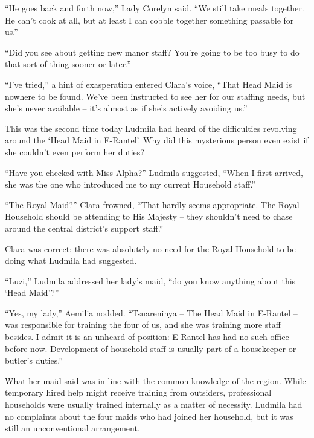  

“He goes back and forth now,” Lady Corelyn said. “We still take meals together. He can’t cook at all, but at least I can cobble together something passable for us.”

 

“Did you see about getting new manor staff? You’re going to be too busy to do that sort of thing sooner or later.”

 

“I’ve tried,” a hint of exasperation entered Clara’s voice, “That Head Maid is nowhere to be found. We’ve been instructed to see her for our staffing needs, but she's never available – it’s almost as if she’s actively avoiding us.”

 

This was the second time today Ludmila had heard of the difficulties revolving around the ‘Head Maid in E-Rantel’. Why did this mysterious person even exist if she couldn’t even perform her duties?

 

“Have you checked with Miss Alpha?” Ludmila suggested, “When I first arrived, she was the one who introduced me to my current Household staff.”

 

“The Royal Maid?” Clara frowned, “That hardly seems appropriate. The Royal Household should be attending to His Majesty – they shouldn’t need to chase around the central district’s support staff.”

 

Clara was correct: there was absolutely no need for the Royal Household to be doing what Ludmila had suggested.

 

“Luzi,” Ludmila addressed her lady’s maid, “do you know anything about this ‘Head Maid’?”

 

“Yes, my lady,” Aemilia nodded. “Tsuareninya – The Head Maid in E-Rantel – was responsible for training the four of us, and she was training more staff besides. I admit it is an unheard of position: E-Rantel has had no such office before now. Development of household staff is usually part of a housekeeper or butler’s duties.”

 

What her maid said was in line with the common knowledge of the region. While temporary hired help might receive training from outsiders, professional households were usually trained internally as a matter of necessity. Ludmila had no complaints about the four maids who had joined her household, but it was still an unconventional arrangement.

